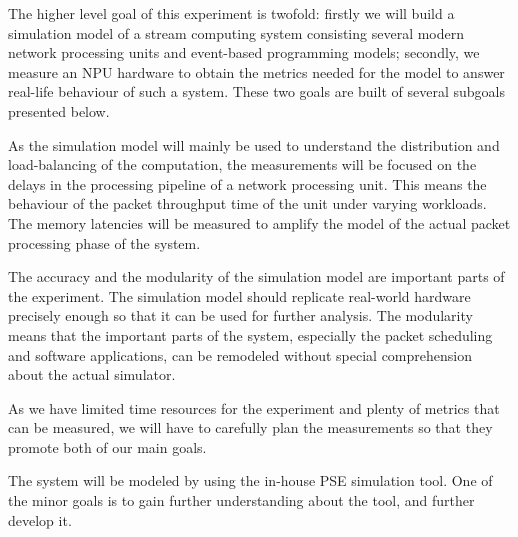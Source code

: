 The higher level goal of this experiment is twofold: firstly we will build a simulation model of a stream computing system consisting several modern network processing units and event-based programming models; secondly, we measure an NPU hardware to obtain the metrics needed for the model to answer real-life behaviour of such a system. These two goals are built of several subgoals presented below.

As the simulation model will mainly be used to understand the distribution and load-balancing of the computation, the measurements will be focused on the delays in the processing pipeline of a network processing unit. This means the behaviour of the packet throughput time of the unit under varying workloads. The memory latencies will be measured to amplify the model of the actual packet processing phase of the system.

The accuracy and the modularity of the simulation model are important parts of the experiment. The simulation model should replicate real-world hardware precisely enough so that it can be used for further analysis. The modularity means that the important parts of the system, especially the packet scheduling and software applications, can be remodeled without special comprehension about the actual simulator.

As we have limited time resources for the experiment and plenty of metrics that can be measured, we will have to carefully plan the measurements so that they promote both of our main goals.

The system will be modeled by using the in-house PSE simulation tool. One of the minor goals is to gain further understanding about the tool, and further develop it.

